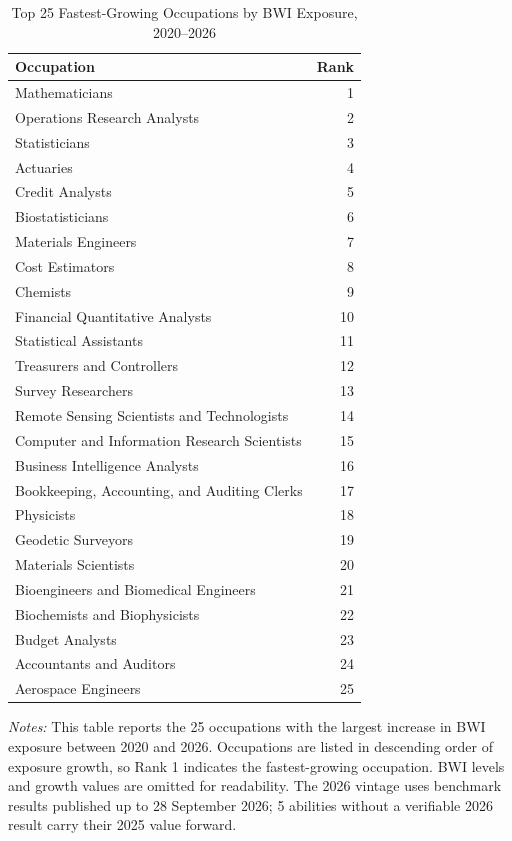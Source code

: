 \begin{table}[htbp]\centering
\caption{Top 25 Fastest-Growing Occupations by BWI Exposure, 2020--2026}\label{tab:fastest}
\begin{tabular}{lr}\toprule
Occupation & Rank \\ \midrule
Mathematicians & 1 \\
Operations Research Analysts & 2 \\
Statisticians & 3 \\
Actuaries & 4 \\
Credit Analysts & 5 \\
Biostatisticians & 6 \\
Materials Engineers & 7 \\
Cost Estimators & 8 \\
Chemists & 9 \\
Financial Quantitative Analysts & 10 \\
Statistical Assistants & 11 \\
Treasurers and Controllers & 12 \\
Survey Researchers & 13 \\
Remote Sensing Scientists and Technologists & 14 \\
Computer and Information Research Scientists & 15 \\
Business Intelligence Analysts & 16 \\
Bookkeeping, Accounting, and Auditing Clerks & 17 \\
Physicists & 18 \\
Geodetic Surveyors & 19 \\
Materials Scientists & 20 \\
Bioengineers and Biomedical Engineers & 21 \\
Biochemists and Biophysicists & 22 \\
Budget Analysts & 23 \\
Accountants and Auditors & 24 \\
Aerospace Engineers & 25 \\
\bottomrule\end{tabular}
\begin{minipage}{0.95\linewidth}\footnotesize \textit{Notes:} This table reports the 25 occupations with the largest increase in BWI exposure between 2020 and 2026. Occupations are listed in descending order of exposure growth, so Rank 1 indicates the fastest-growing occupation. BWI levels and growth values are omitted for readability. The 2026 vintage uses benchmark results published up to 28 September 2026; 5 abilities without a verifiable 2026 result carry their 2025 value forward.\end{minipage}
\end{table}
